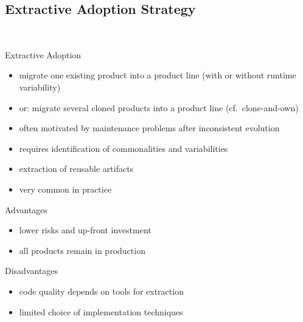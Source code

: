 \subsection{Extractive Adoption Strategy}
\begin{frame}{\myframetitle\ }
	\begin{mycolumns}[animation=none]
		\begin{definition}{Extractive Adoption}
			\begin{itemize}
				\item migrate one existing product into a product line (with or without runtime variability)
				\item or: migrate several cloned products into a product line (cf.\ clone-and-own)
				\item often motivated by maintenance problems after inconsistent evolution
				\item requires identification of commonalities and variabilities
				\item extraction of reusable artifacts
				\item very common in practice
			\end{itemize}
		\end{definition}
	\mynextcolumn
		\begin{note}{Advantages}
			\begin{itemize}
				\item lower risks and up-front investment
				\item all products remain in production
			\end{itemize}
		\end{note}
		\begin{note}{Disadvantages}
			\begin{itemize}
				\item code quality depends on tools for extraction
				\item limited choice of implementation techniques
			\end{itemize}
		\end{note}
	\end{mycolumns}
\end{frame}

